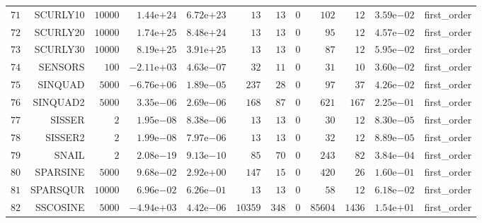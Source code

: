 \begin{longtable}{rrrrrrrrrrrr}
  \(    71\) & SCURLY10 & \( 10000\) & \( 1.44\)e\(+24\) & \( 6.72\)e\(+23\) & \(    13\) & \(    13\) & \(     0\) & \(   102\) & \(    12\) & \( 3.59\)e\(-02\) & first\_order \\
  \(    72\) & SCURLY20 & \( 10000\) & \( 1.74\)e\(+25\) & \( 8.48\)e\(+24\) & \(    13\) & \(    13\) & \(     0\) & \(    95\) & \(    12\) & \( 4.57\)e\(-02\) & first\_order \\
  \(    73\) & SCURLY30 & \( 10000\) & \( 8.19\)e\(+25\) & \( 3.91\)e\(+25\) & \(    13\) & \(    13\) & \(     0\) & \(    87\) & \(    12\) & \( 5.95\)e\(-02\) & first\_order \\
  \(    74\) & SENSORS & \(   100\) & \(-2.11\)e\(+03\) & \( 4.63\)e\(-07\) & \(    32\) & \(    11\) & \(     0\) & \(    31\) & \(    10\) & \( 3.60\)e\(-02\) & first\_order \\
  \(    75\) & SINQUAD & \(  5000\) & \(-6.76\)e\(+06\) & \( 1.89\)e\(-05\) & \(   237\) & \(    28\) & \(     0\) & \(    97\) & \(    37\) & \( 4.26\)e\(-02\) & first\_order \\
  \(    76\) & SINQUAD2 & \(  5000\) & \( 3.35\)e\(-06\) & \( 2.69\)e\(-06\) & \(   168\) & \(    87\) & \(     0\) & \(   621\) & \(   167\) & \( 2.25\)e\(-01\) & first\_order \\
  \(    77\) & SISSER & \(     2\) & \( 1.95\)e\(-08\) & \( 8.38\)e\(-06\) & \(    13\) & \(    13\) & \(     0\) & \(    30\) & \(    12\) & \( 8.30\)e\(-05\) & first\_order \\
  \(    78\) & SISSER2 & \(     2\) & \( 1.99\)e\(-08\) & \( 7.97\)e\(-06\) & \(    13\) & \(    13\) & \(     0\) & \(    32\) & \(    12\) & \( 8.89\)e\(-05\) & first\_order \\
  \(    79\) & SNAIL & \(     2\) & \( 2.08\)e\(-19\) & \( 9.13\)e\(-10\) & \(    85\) & \(    70\) & \(     0\) & \(   243\) & \(    82\) & \( 3.84\)e\(-04\) & first\_order \\
  \(    80\) & SPARSINE & \(  5000\) & \( 9.68\)e\(-02\) & \( 2.92\)e\(+00\) & \(   147\) & \(    15\) & \(     0\) & \(   420\) & \(    26\) & \( 1.60\)e\(-01\) & first\_order \\
  \(    81\) & SPARSQUR & \( 10000\) & \( 6.96\)e\(-02\) & \( 6.26\)e\(-01\) & \(    13\) & \(    13\) & \(     0\) & \(    58\) & \(    12\) & \( 6.18\)e\(-02\) & first\_order \\
  \(    82\) & SSCOSINE & \(  5000\) & \(-4.94\)e\(+03\) & \( 4.42\)e\(-06\) & \( 10359\) & \(   348\) & \(     0\) & \( 85604\) & \(  1436\) & \( 1.54\)e\(+01\) & first\_order \\

\end{longtable}
